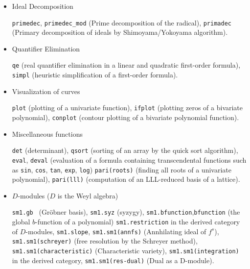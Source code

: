 \documentclass[12pt]{article}
\begin{document}
\begin{itemize}
{\tt dp\_gr\_main }, {\tt nd\_gr\_trace} (Groebner basis computation of a polynomial ideal
over the rationals by the trace lifting),
{\tt dp\_gr\_mod\_main }, {\tt nd\_gr} (Groebner basis over small finite fields),
{\tt tolex } (Modular change of ordering for a zero-dimensional ideal),
{\tt tolex\_gsl } (Modular rational univariate representation
for a zero-dimensional ideal),
{\tt dp\_f4\_main}, {\tt dp\_f4\_mod\_main}, {\tt nd\_f4} 
($F_4$ over the rationals and small finite fields).

\item Ideal Decomposition

{\tt primedec}, {\tt primedec\_mod} (Prime decomposition of the radical),
{\tt primadec} (Primary decomposition of ideals by Shimoyama/Yokoyama algorithm).

\item Quantifier Elimination

{\tt qe} (real quantifier elimination in a linear and
quadratic first-order formula),
{\tt simpl} (heuristic simplification of a first-order formula).

\item Visualization of curves

{\tt plot} (plotting of a univariate function),
{\tt ifplot} (plotting zeros of a bivariate polynomial),
{\tt conplot} (contour plotting of a bivariate polynomial function).

\item Miscellaneous functions

{\tt det} (determinant),
{\tt qsort} (sorting of an array by the quick sort algorithm),
{\tt eval}, {\tt deval} (evaluation of a formula containing transcendental functions
such as
{\tt sin}, {\tt cos}, {\tt tan}, {\tt exp},
{\tt log})
{\tt pari(roots)} (finding all roots of a univariate polynomial),
{\tt pari(lll)} (computation of an LLL-reduced basis of a lattice).

\item $D$-modules ($D$ is the Weyl algebra)

{\tt sm1.gb } (Gr\"obner basis),
{\tt sm1.syz} (syzygy),
{\tt sm1.bfunction},{\tt bfunction} (the global $b$-function of a polynomial)
{\tt sm1.restriction} in the derived category of $D$-modules,
{\tt sm1.slope},
{\tt sm1.sm1(annfs)} (Annhilating ideal of $f^s$),
{\tt sm1.sm1(schreyer)} (free resolution by the Schreyer method),
{\tt sm1.sm1(characteristic)} (Characteristic variety),
{\tt sm1.sm1(integration)} in the derived category,
{\tt sm1.sm1(res-dual)} (Dual as a D-module).


\end{itemize}
\end{document}
